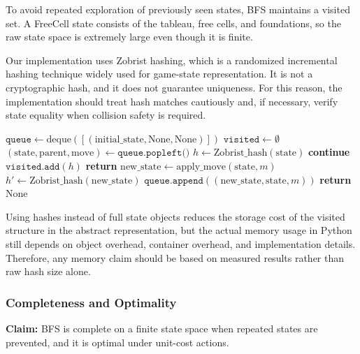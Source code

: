 \documentclass{article}
\begin{document}
To avoid repeated exploration of previously seen states, BFS maintains a visited set. A FreeCell state consists of the tableau, free cells, and foundations, so the raw state space is extremely large even though it is finite.

Our implementation uses Zobrist hashing, which is a randomized incremental hashing technique widely used for game-state representation. It is not a cryptographic hash, and it does not guarantee uniqueness. For this reason, the implementation should treat hash matches cautiously and, if necessary, verify state equality when collision safety is required.

\begin{algorithm}
\caption{BFS with Zobrist Hashing}
\begin{algorithmic}[1]
\State $\texttt{queue} \leftarrow \text{deque}([(\text{initial_state}, \text{None}, \text{None})])$
\State $\texttt{visited} \leftarrow \emptyset$
\State $(\text{state}, \text{parent}, \text{move}) \leftarrow \texttt{queue.popleft()}$
\State $h \leftarrow \text{Zobrist\_hash}(\text{state})$
\State \textbf{continue}
\EndIf
\State $\texttt{visited.add}(h)$
\State \textbf{return} 
\EndIf
{}
\State $\text{new\_state} \leftarrow \text{apply\_move}(\text{state}, m)$
\State $h' \leftarrow \text{Zobrist\_hash}(\text{new\_state})$
\State $\texttt{queue.append}((\text{new\_state}, \text{state}, m))$
\EndIf
\EndFor
\EndWhile
\State \textbf{return} $\text{None}$
\EndFunction
\end{algorithmic}
\end{algorithm}

Using hashes instead of full state objects reduces the storage cost of the visited structure in the abstract representation, but the actual memory usage in Python still depends on object overhead, container overhead, and implementation details. Therefore, any memory claim should be based on measured results rather than raw hash size alone.

\subsubsection{Completeness and Optimality}

\textbf{Claim:} BFS is complete on a finite state space when repeated states are prevented, and it is optimal under unit-cost actions.
\end{document}
